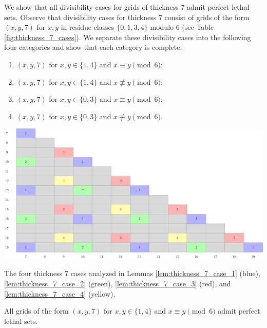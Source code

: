 We show that all divisibility cases for grids of thickness 7 admit perfect lethal sets. Observe that divisibility cases for thickness 7 consist of grids of the form $(x,y,7)$ for $x,y$ in residue classes $\{0,1,3,4\}$ modulo 6 (see Table \ref{fig:thickness_7_cases}). We separate these divisibility cases into the following four categories and show that each category is complete:
\begin{enumerate}
\item $(x,y,7)$ for $x,y \in \{1,4\}$ and $x \equiv y \pmod 6$;
\item $(x,y,7)$ for $x,y \in \{1,4\}$ and $x \not\equiv y \pmod 6$;
\item $(x,y,7)$ for $x,y \in \{0,3\}$ and $x \equiv y \pmod 6$;
\item $(x,y,7)$ for $x,y \in \{0,3\}$ and $x \not\equiv y \pmod 6$.
\end{enumerate}

\begin{table}[]
\centering
\includegraphics[width=\textwidth]{tables/4/thickness_7_cases.pdf}
\caption{The four thickness 7 cases analyzed in Lemmas \ref{lem:thickness_7_case_1} (blue), \ref{lem:thickness_7_case_2} (green), \ref{lem:thickness_7_case_3} (red), and \ref{lem:thickness_7_case_4} (yellow).}
\label{fig:thickness_7_cases}
\end{table}

\begin{lem}
\label{lem:thickness_7_case_1}
All grids of the form $(x,y,7)$ for $x,y \in \{1,4\}$ and $x \equiv y \pmod 6$ admit perfect lethal sets.
\end{lem}

